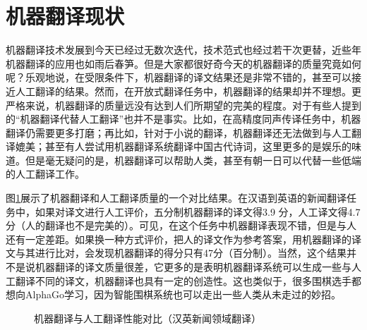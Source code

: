 \section{机器翻译现状}
\parinterval 机器翻译技术发展到今天已经过无数次迭代，技术范式也经过若干次更替，近些年机器翻译的应用也如雨后春笋。但是大家都很好奇今天的机器翻译的质量究竟如何呢？乐观地说，在受限条件下，机器翻译的译文结果还是非常不错的，甚至可以接近人工翻译的结果。然而，在开放式翻译任务中，机器翻译的结果却并不理想。更严格来说，机器翻译的质量远没有达到人们所期望的完美的程度。对于有些人提到的``机器翻译代替人工翻译''也并不是事实。比如，在高精度同声传译任务中，机器翻译仍需要更多打磨；再比如，针对于小说的翻译，机器翻译还无法做到与人工翻译媲美；甚至有人尝试用机器翻译系统翻译中国古代诗词，这里更多的是娱乐的味道。但是毫无疑问的是，机器翻译可以帮助人类，甚至有朝一日可以代替一些低端的人工翻译工作。

\parinterval 图\ref{fig:1-7}展示了机器翻译和人工翻译质量的一个对比结果。在汉语到英语的新闻翻译任务中，如果对译文进行人工评价，五分制机器翻译的译文得3.9 分，人工译文得4.7分（人的翻译也不是完美的）。可见，在这个任务中机器翻译表现不错，但是与人还有一定差距。如果换一种方式评价，把人的译文作为参考答案，用机器翻译的译文与其进行比对，会发现机器翻译的得分只有47分（百分制）。当然，这个结果并不是说机器翻译的译文质量很差，它更多的是表明机器翻译系统可以生成一些与人工翻译不同的译文，机器翻译也具有一定的创造性。这也类似于，很多围棋选手都想向AlphaGo学习，因为智能围棋系统也可以走出一些人类从未走过的妙招。

\begin{figure}[htp]
   \centering

\setlength{\belowcaptionskip}{-0.5em}
    \caption{机器翻译与人工翻译性能对比（汉英新闻领域翻译）}
    \label{fig:1-7}
\end{figure}

